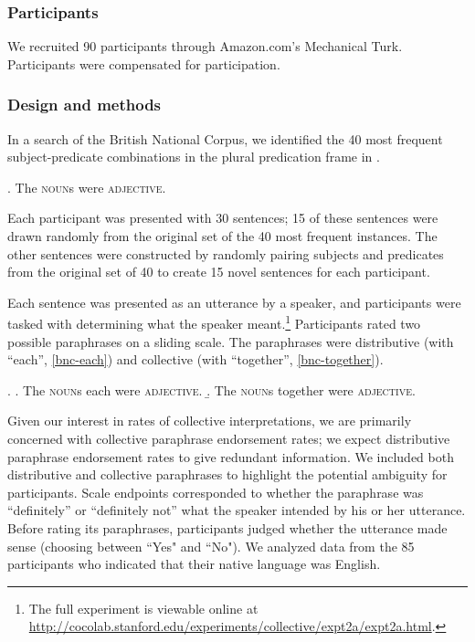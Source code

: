 \documentclass[preprint,12pt,authoryear,titlepage]{elsarticle}
\newcommand{\ndg}[1]{\textcolor{Green}{[ndg: #1]}}
\newcommand{\gcs}[1]{\textcolor{blue}{[gcs: #1]}}
\begin{document}
\subsubsection{Participants}

We recruited 90 participants through Amazon.com's Mechanical Turk. Participants were compensated for participation.

\subsubsection{Design and methods}

In a search of the British National Corpus, we identified the 40 most frequent subject-predicate combinations in the plural predication frame in \Next.

\ex. The \textsc{noun}s were \textsc{adjective}.

Each participant was presented with 30 sentences; 15 of these sentences were drawn randomly 
from the original set of the 40 most frequent instances. The other sentences were constructed by randomly pairing subjects and predicates from the original set of 40 to create 15 novel sentences for each participant. 

Each sentence was presented as an utterance by a speaker, and participants were tasked with determining what the speaker meant.\footnote{The full experiment is viewable online at \url{http://cocolab.stanford.edu/experiments/collective/expt2a/expt2a.html}.} Participants rated two possible paraphrases on a sliding scale. The paraphrases were distributive (with ``each'', \ref{bnc-each}) and collective (with ``together'', \ref{bnc-together}). 

\ex. \a. The \textsc{noun}s each were \textsc{adjective}. \label{bnc-each}
\b. The \textsc{noun}s together were \textsc{adjective}. \label{bnc-together}

Given our interest in rates of collective interpretations, we are primarily concerned with collective paraphrase endorsement rates; we expect distributive paraphrase endorsement rates to give redundant information.  We included both distributive and collective paraphrases to highlight the potential ambiguity for participants.
Scale endpoints corresponded to whether the paraphrase was ``definitely'' or ``definitely not'' what the speaker intended by his or her utterance. Before rating its paraphrases, participants judged whether the utterance made sense (choosing between ``Yes" and ``No"). We analyzed data from the 85 participants who indicated that their native language was English.
\end{document}
